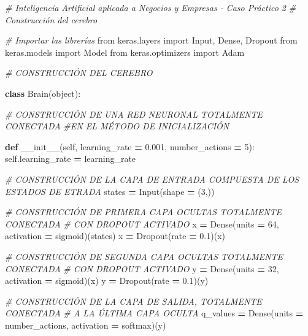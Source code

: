\documentclass[
]{book}
\newenvironment{Shaded}{\begin{snugshade}}{\end{snugshade}}
\newcommand{\BuiltInTok}[1]{#1}
\newcommand{\CommentTok}[1]{\textcolor[rgb]{0.56,0.35,0.01}{\textit{#1}}}
\newcommand{\DecValTok}[1]{\textcolor[rgb]{0.00,0.00,0.81}{#1}}
\newcommand{\FloatTok}[1]{\textcolor[rgb]{0.00,0.00,0.81}{#1}}
\newcommand{\FunctionTok}[1]{\textcolor[rgb]{0.00,0.00,0.00}{#1}}
\newcommand{\ImportTok}[1]{#1}
\newcommand{\KeywordTok}[1]{\textcolor[rgb]{0.13,0.29,0.53}{\textbf{#1}}}
\newcommand{\NormalTok}[1]{#1}
\newcommand{\OperatorTok}[1]{\textcolor[rgb]{0.81,0.36,0.00}{\textbf{#1}}}
\newcommand{\StringTok}[1]{\textcolor[rgb]{0.31,0.60,0.02}{#1}}
\newcommand{\VariableTok}[1]{\textcolor[rgb]{0.00,0.00,0.00}{#1}}
\begin{document}
\begin{Shaded}
\begin{Highlighting}[]
\CommentTok{\# Inteligencia Artificial aplicada a Negocios y Empresas {-} Caso Práctico 2}
\CommentTok{\# Construcción del cerebro}

\CommentTok{\# Importar las librerías}
\ImportTok{from}\NormalTok{ keras.layers }\ImportTok{import}\NormalTok{ Input, Dense, Dropout}
\ImportTok{from}\NormalTok{ keras.models }\ImportTok{import}\NormalTok{ Model}
\ImportTok{from}\NormalTok{ keras.optimizers }\ImportTok{import}\NormalTok{ Adam}

\CommentTok{\# CONSTRUCCIÓN DEL CEREBRO}

\KeywordTok{class}\NormalTok{ Brain(}\BuiltInTok{object}\NormalTok{):}
    
    \CommentTok{\# CONSTRUCCIÓN DE UNA RED NEURONAL TOTALMENTE CONECTADA }
    \CommentTok{\#EN EL MÉTODO DE INICIALIZACIÓN}
    
    \KeywordTok{def} \FunctionTok{\_\_init\_\_}\NormalTok{(}\VariableTok{self}\NormalTok{, learning\_rate }\OperatorTok{=} \FloatTok{0.001}\NormalTok{, number\_actions }\OperatorTok{=} \DecValTok{5}\NormalTok{):}
        \VariableTok{self}\NormalTok{.learning\_rate }\OperatorTok{=}\NormalTok{ learning\_rate}
        
        \CommentTok{\# CONSTRUCCIÓN DE LA CAPA DE ENTRADA COMPUESTA DE LOS ESTADOS DE ETRADA}
\NormalTok{        states }\OperatorTok{=}\NormalTok{ Input(shape }\OperatorTok{=}\NormalTok{ (}\DecValTok{3}\NormalTok{,))}
        
        \CommentTok{\# CONSTRUCCIÓN DE PRIMERA CAPA OCULTAS TOTALMENTE CONECTADA }
        \CommentTok{\# CON DROPOUT ACTIVADO}
\NormalTok{        x }\OperatorTok{=}\NormalTok{ Dense(units }\OperatorTok{=} \DecValTok{64}\NormalTok{, activation }\OperatorTok{=} \StringTok{\textquotesingle{}sigmoid\textquotesingle{}}\NormalTok{)(states)}
\NormalTok{        x }\OperatorTok{=}\NormalTok{ Dropout(rate }\OperatorTok{=} \FloatTok{0.1}\NormalTok{)(x)}

        \CommentTok{\# CONSTRUCCIÓN DE SEGUNDA CAPA OCULTAS TOTALMENTE CONECTADA }
        \CommentTok{\# CON DROPOUT ACTIVADO}
\NormalTok{        y }\OperatorTok{=}\NormalTok{ Dense(units }\OperatorTok{=} \DecValTok{32}\NormalTok{, activation }\OperatorTok{=} \StringTok{\textquotesingle{}sigmoid\textquotesingle{}}\NormalTok{)(x)}
\NormalTok{        y }\OperatorTok{=}\NormalTok{ Dropout(rate }\OperatorTok{=} \FloatTok{0.1}\NormalTok{)(y)}

        \CommentTok{\# CONSTRUCCIÓN DE LA CAPA DE SALIDA, TOTALMENTE CONECTADA }
        \CommentTok{\# A LA ÚLTIMA CAPA OCULTA}
\NormalTok{        q\_values }\OperatorTok{=}\NormalTok{ Dense(units }\OperatorTok{=}\NormalTok{ number\_actions, activation }\OperatorTok{=} \StringTok{\textquotesingle{}softmax\textquotesingle{}}\NormalTok{)(y)}
        

\end{Highlighting}
\end{Shaded}
\end{document}
